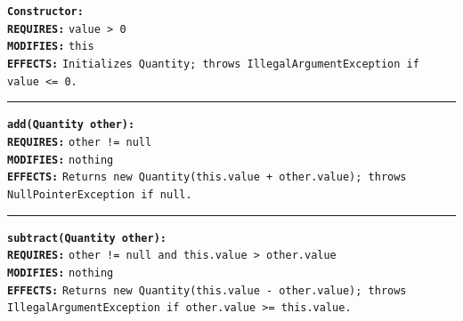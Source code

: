 \documentclass[11pt,a4paper]{article}
\begin{document}
\begin{contractbox}
\begin{latin}
\setlength{\parindent}{0pt}
\setlength{\parskip}{2pt}
\small
\textbf{\color{autnavy}\texttt{Constructor:}} \\
\hspace*{1.5em}\textbf{\color{darkred}\texttt{REQUIRES:}} \texttt{value > 0} \\
\hspace*{1.5em}\textbf{\color{autblue}\texttt{MODIFIES:}} \texttt{this} \\
\hspace*{1.5em}\textbf{\color{autteal}\texttt{EFFECTS:}}  \texttt{Initializes Quantity; throws IllegalArgumentException if value <= 0.}

\vspace{4pt}\hrule\vspace{4pt}

\textbf{\color{autnavy}\texttt{add(Quantity other):}} \\
\hspace*{1.5em}\textbf{\color{darkred}\texttt{REQUIRES:}} \texttt{other != null} \\
\hspace*{1.5em}\textbf{\color{autblue}\texttt{MODIFIES:}} \texttt{nothing} \\
\hspace*{1.5em}\textbf{\color{autteal}\texttt{EFFECTS:}}  \texttt{Returns new Quantity(this.value + other.value); throws NullPointerException if null.}

\vspace{4pt}\hrule\vspace{4pt}

\textbf{\color{autnavy}\texttt{subtract(Quantity other):}} \\
\hspace*{1.5em}\textbf{\color{darkred}\texttt{REQUIRES:}} \texttt{other != null and this.value > other.value} \\
\hspace*{1.5em}\textbf{\color{autblue}\texttt{MODIFIES:}} \texttt{nothing} \\
\hspace*{1.5em}\textbf{\color{autteal}\texttt{EFFECTS:}}  \texttt{Returns new Quantity(this.value - other.value); throws IllegalArgumentException if other.value >= this.value.}
\end{latin}
\end{contractbox}

\end{document}
